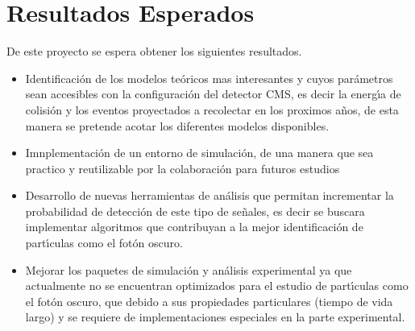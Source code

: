 \chapter{Resultados Esperados} 

De este proyecto se espera obtener los siguientes resultados.

\begin{itemize}
\item Identificaci\'on de los modelos te\'oricos mas interesantes y cuyos par\'ametros sean accesibles con la configuraci\'on del detector CMS, es decir la energ\'{\i}a de colisi\'on y los eventos proyectados a recolectar en los proximos a\~nos, de esta manera se pretende acotar los diferentes modelos disponibles.
\item Imnplementaci\'on de un entorno de simulaci\'on, de una manera que sea practico y reutilizable por la colaboraci\'on para futuros estudios
\item Desarrollo de nuevas herramientas de an\'alisis que permitan incrementar la probabilidad de detecci\'on de este tipo de se\~nales, es decir se buscara implementar algoritmos que contribuyan a la mejor identificaci\'on de part\'{\i}culas como el fot\'on oscuro.
\item Mejorar los paquetes de simulaci\'on y an\'alisis experimental ya que actualmente no se encuentran optimizados para el estudio de part\'{\i}culas como el fot\'on oscuro, que debido a sus propiedades particulares (tiempo de vida largo) y se requiere de implementaciones especiales en la parte experimental.
\end{itemize}




